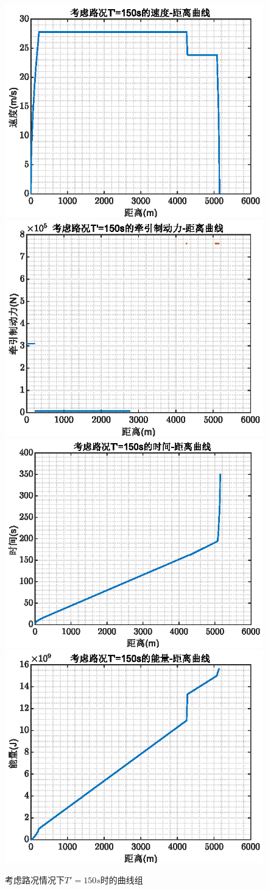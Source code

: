 \documentclass[12pt,a4paper]{nmmcm}
\begin{document}
\begin{figure}[H]
\centering
\includegraphics[width=.49\textwidth,height=0.3\textwidth]{figures/150aa.eps}
\includegraphics[width=.49\textwidth,height=0.3\textwidth]{figures/150bb.eps}
\includegraphics[width=.49\textwidth,height=0.3\textwidth]{figures/150cc.eps}
\includegraphics[width=.49\textwidth,height=0.3\textwidth]{figures/150dd.eps}
\caption{\song\wuhao 考虑路况情况下$T'=150s$时的曲线组}
\end{figure}
\end{document}
